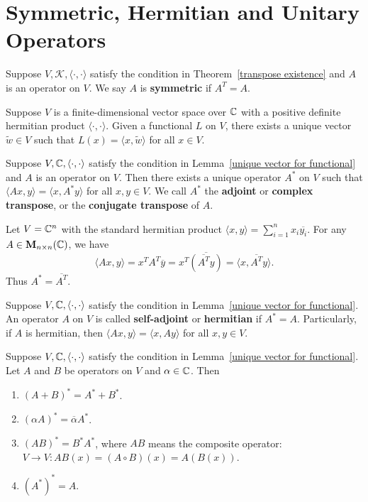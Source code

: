     \section{Symmetric, Hermitian and Unitary Operators}
    \begin{definitionenv}
        Suppose $V,\mathcal{K}, \langle \cdot, \cdot \rangle$ satisfy the condition in Theorem~\ref{transpose existence} and $A$ is an operator on $V$. We say $A$ is \textbf{symmetric} if $A^T = A$.
    \end{definitionenv}
    \begin{lemmaenv}\label{unique vector for functional}
        Suppose $V$ is a finite-dimensional vector space over $\mathbb{C}$ with a positive definite hermitian product $\langle \cdot, \cdot \rangle$. Given a functional $L$ on $V$, there exists a unique vector $\tilde{w} \in V$ such that $L(x) = \langle x, \tilde{w} \rangle$ for all $x\in V$.
    \end{lemmaenv}
    \begin{theoremenv}
        Suppose $V, \mathbb{C}, \langle \cdot, \cdot \rangle$ satisfy the condition in Lemma~\ref{unique vector for functional} and $A$ is an operator on $V$. Then there exists a unique operator $A^*$ on $V$ such that $\langle A x, y \rangle = \langle x, A^* y \rangle$ for all $x,y \in V$. We call $A^*$ the \textbf{adjoint} or \textbf{complex transpose}, or the \textbf{conjugate transpose} of $A$.
    \end{theoremenv}
    \begin{exampleenv}
        Let $V = \mathbb{C}^n$ with the standard hermitian product $\langle x, y \rangle = \displaystyle \sum_{i=1}^n x_i \overline{y_i}$. For any $A \in \mathbf{M}_{n \times n}(\mathbb{C})$, we have $$\langle A x, y \rangle = x^T A^T \overline{y} = x^T \overline{ \left( \overline{A^T} y \right) } = \langle x, \overline{A^T} y \rangle.$$ Thus $A^* = \overline{A^T}$.
    \end{exampleenv}
    \begin{definitionenv}
        Suppose $V, \mathbb{C}, \langle \cdot, \cdot \rangle$ satisfy the condition in Lemma~\ref{unique vector for functional}. An operator $A$ on $V$ is called \textbf{self-adjoint} or \textbf{hermitian} if $A^* = A$. Particularly, if $A$ is hermitian, then $\langle A x, y \rangle = \langle x, A y \rangle$ for all $x,y \in V$.
    \end{definitionenv}
    \begin{theoremenv}
        Suppose $V, \mathbb{C}, \langle \cdot, \cdot \rangle$ satisfy the condition in Lemma~\ref{unique vector for functional}. Let $A$ and $B$ be operators on $V$ and $\alpha \in \mathbb{C}$. Then
        \begin{enumerate}
            \item $(A+B)^* = A^* + B^*$.
            \item $(\alpha A)^* = \overline{\alpha} A^*$.
            \item $(AB)^* = B^* A^*$, where $AB$ means the composite operator: $V\to V: AB(x) = (A\circ B)(x) = A(B(x))$.
            \item $(A^*)^* = A$.
        \end{enumerate}
    \end{theoremenv}
